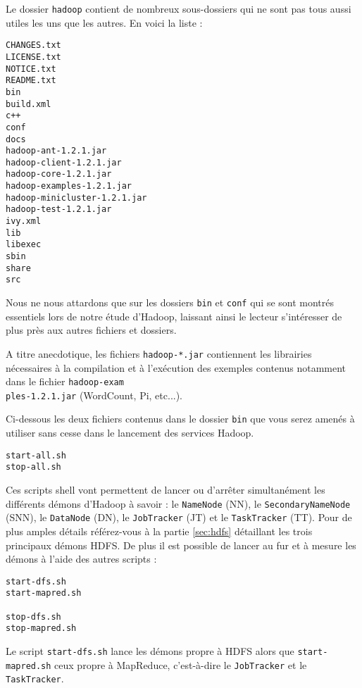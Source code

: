\par Le dossier \texttt{hadoop} contient de nombreux sous-dossiers qui ne sont pas tous aussi utiles les uns que les autres. En voici la liste :

\begin{verbatim}
CHANGES.txt
LICENSE.txt
NOTICE.txt
README.txt
bin
build.xml
c++
conf
docs
hadoop-ant-1.2.1.jar
hadoop-client-1.2.1.jar
hadoop-core-1.2.1.jar
hadoop-examples-1.2.1.jar
hadoop-minicluster-1.2.1.jar
hadoop-test-1.2.1.jar
ivy.xml
lib
libexec
sbin
share
src
\end{verbatim}

\par Nous ne nous attardons que sur les dossiers \texttt{bin} et \texttt{conf} qui se sont montrés essentiels lors de notre étude d'Hadoop, laissant ainsi le lecteur s'intéresser de plus près aux autres fichiers et dossiers.

\par A titre anecdotique, les fichiers \texttt{hadoop-*.jar} contiennent les librairies nécessaires à la compilation et à l'exécution des exemples contenus notamment dans le fichier \texttt{hadoop-exam\\ples-1.2.1.jar} (WordCount, Pi, etc...).

\par Ci-dessous les deux fichiers contenus dans le dossier \texttt{bin} que vous serez amenés à utiliser sans cesse dans le lancement des services Hadoop.

\begin{verbatim}
start-all.sh
stop-all.sh			
\end{verbatim}

\par Ces scripts shell vont permettent de lancer ou d'arrêter simultanément les différents démons d'Hadoop à savoir : le \texttt{NameNode} (NN), le \texttt{SecondaryNameNode} (SNN), le \texttt{DataNode} (DN), le \texttt{JobTracker} (JT) et le \texttt{TaskTracker} (TT). Pour de plus amples détails référez-vous à la partie \ref{sec:hdfs} détaillant les trois principaux démons HDFS. De plus il est possible de lancer au fur et à mesure les démons à l'aide des autres scripts :

\begin{verbatim}
start-dfs.sh
start-mapred.sh

stop-dfs.sh
stop-mapred.sh
\end{verbatim}

\par Le script \texttt{start-dfs.sh} lance les démons propre à HDFS alors que \texttt{start-mapred.sh} ceux propre à MapReduce, c'est-à-dire le \texttt{JobTracker} et le \texttt{TaskTracker}.

